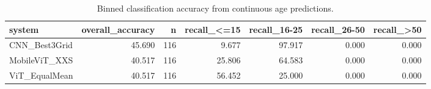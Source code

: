 \begin{table}[htbp]
\centering
\caption{Binned classification accuracy from continuous age predictions.}
\label{tab:binned-classification}
\begin{tabular}{lrrrrrr}
\toprule
system & overall\_accuracy & n & recall\_<=15 & recall\_16-25 & recall\_26-50 & recall\_>50 \\
\midrule
CNN\_Best3Grid & 45.690 & 116 & 9.677 & 97.917 & 0.000 & 0.000 \\
MobileViT\_XXS & 40.517 & 116 & 25.806 & 64.583 & 0.000 & 0.000 \\
ViT\_EqualMean & 40.517 & 116 & 56.452 & 25.000 & 0.000 & 0.000 \\
\bottomrule
\end{tabular}
\end{table}

